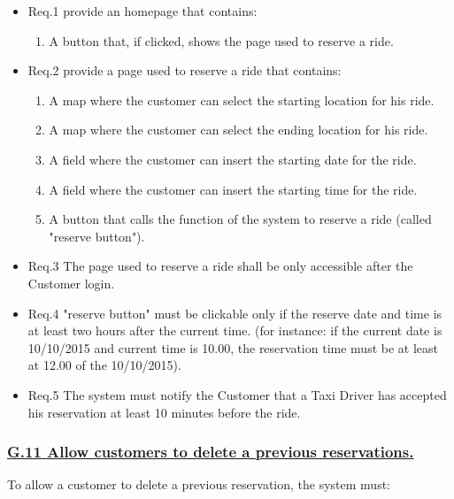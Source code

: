 				\begin{itemize}
					\item \lbrack Req.1\rbrack \label{sec:fr1_g10} provide an homepage that contains:
						\begin{enumerate}
							\item A button that, if clicked, shows the page used to reserve a ride.
						\end{enumerate}
					\item \lbrack Req.2\rbrack \label{sec:fr2_g10} provide a page used to reserve a ride that contains:
						\begin{enumerate}
							\item A map where the customer can select the starting location for his ride.
							\item A map where the customer can select the ending location for his ride.
							\item A field where the customer can insert the starting date for the ride.
							\item A field where the customer can insert the starting time for the ride.
							\item A button that calls the function of the system to reserve a ride (called "reserve button").
						\end{enumerate}
					\item \lbrack Req.3\rbrack \label{sec:fr3_g10} The page used to reserve a ride shall be only accessible after the Customer login.
					\item \lbrack Req.4\rbrack \label{sec:fr4_g10} "reserve button" must be clickable only if the reserve date and time is at least two hours after the current time. (for instance: if the current date is 10/10/2015 and current time is 10.00, the reservation time must be at least at 12.00 of the 10/10/2015).
					\item \lbrack Req.5\rbrack \label{sec:fr5_g10} The system must notify the Customer that a Taxi Driver has accepted his reservation at least 10 minutes before the ride.
				\end{itemize}

			\subsubsection{\lbrack \hyperref[sec:g11]{G.11 Allow customers to delete a previous reservations.}\rbrack}\label{sec:frs11}
			To allow a customer to delete a previous reservation, the system must:

